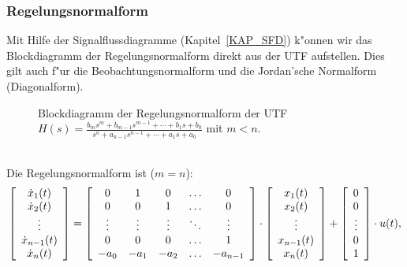 \subsubsection{Regelungsnormalform}
Mit Hilfe der Signalflussdiagramme (Kapitel~\ref{KAP_SFD}) k"onnen wir das Blockdiagramm der Regelungsnormalform direkt aus der UTF aufstellen. Dies gilt auch f"ur die Beobachtungsnormalform und die Jordan'sche Normalform (Diagonalform). 
\begin{figure}[!htb]
\vspace*{-4mm}\begin{center}
  \vspace*{-3mm}\caption{Blockdiagramm der Regelungsnormalform der UTF $H(s)=\frac{b_{m} s^{m} + b_{m-1} s^{m-1} +\cdots+b_{1} s 
+ b_{0}}{s^{n} + a_{n-1} s^{n-1} + \cdots + a_{1} s + a_{0}}$ mit $m<n$.}
\end{center}
\vspace*{-6mm}
\end{figure}\\
\nit Die Regelungsnormalform ist ($m=n$): 
\begin{equation*}
\left [ 
\begin{array}{c}
\dot{x}_1(t)\\
\dot{x}_2(t)\\
\vdots\\
\dot{x}_{n-1}(t)\\
\dot{x}_{n}(t)\\
\end{array}
\right ] =
\left [ 
\begin{array}{c c c c c}
0 & 1 & 0 & \ldots & 0\\
0 & 0 & 1 & \ldots & 0\\
\vdots & \vdots & \vdots & \ddots & \vdots\\
0 & 0 & 0 & \ldots & 1\\
-a_0 & -a_1 & -a_2 & \ldots & -a_{n-1}\\
\end{array}
\right ]\cdot
\left [ 
\begin{array}{c}
x_1(t)\\
x_2(t)\\
\vdots \\
x_{n-1}(t)\\
x_{n}(t)\\
\end{array}
\right ]+
\left [ 
\begin{array}{c}
0 \\
0\\
\vdots\\
0\\
1\\
\end{array}
\right ]\cdot
u(t),
\end{equation*}
